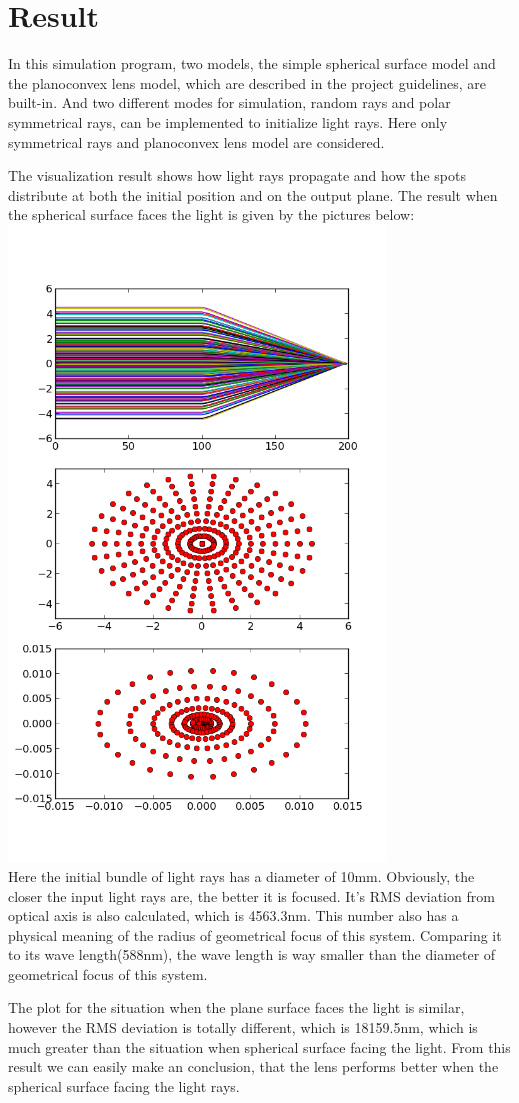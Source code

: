 \documentclass[12pt,a4paper]{article}
\begin{document}
\section{Result}
In this simulation program, two models, the simple spherical surface model and the planoconvex lens model, which are described in the project guidelines, are built-in. And two different modes for simulation, random rays and polar symmetrical rays, can be implemented to initialize light rays. Here only symmetrical rays and planoconvex lens model are considered.

The visualization result shows how light rays propagate and how the spots distribute at both the initial position and on the output plane. The result when the spherical surface faces the light is given by the pictures below:\\
\includegraphics[width=10cm]{figure_1.png} \\
Here the initial bundle of light rays has a diameter of 10mm. Obviously, the closer the input light rays are, the better it is focused. It's RMS deviation from optical axis is also calculated, which is 4563.3nm. This number also has a physical meaning of the radius of geometrical focus of this system. Comparing it to its wave length(588nm), the wave length is way smaller than the diameter of geometrical focus of this system.

The plot for the situation when the plane surface faces the light is similar, however the RMS deviation is totally different, which is 18159.5nm, which is much greater than the situation when spherical surface facing the light. From this result we can easily make an conclusion, that the lens performs better when the spherical surface facing the light rays.
\end{document}
